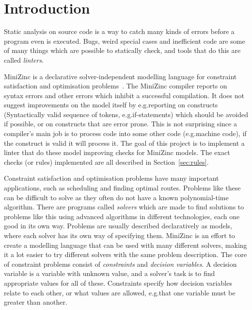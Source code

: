\documentclass[a4paper,12pt]{article}
\newcommand{\leblanc}{\clearpage\thispagestyle{empty}\null\clearpage}
\begin{document}
\leblanc

\tableofcontents

\cleardoublepage

\mainmatter

\section{Introduction}\label{sec:introduktion}
Static analysis on source code is a way to catch many kinds of errors before
a program even is executed.
Bugs, weird special cases and inefficient code are some of many things which are possible
to statically check, and tools that do this are called \emph{linters}.

MiniZinc is a declarative solver-independent modelling language for constraint
satisfaction and optimisation problems~\cite{MiniZinc}. The MiniZinc compiler reports on
syntax errors and other errors which inhibit a successful compilation. It does not suggest
improvements on the model itself by e.g.\@ reporting on constructs (Syntactically valid
sequence of tokens, e.g.\@ if-statements) which should be avoided if possible, or on
constructs that are error prone. This is not surprising since a compiler's main job is to
process code into some other code (e.g.\@ machine code), if the construct is valid it will
process it. The goal of this project is to implement a linter that do these model
improving checks for MiniZinc models. The exact checks (or rules) implemented are all
described in Section~\ref{sec:rules}.

Constraint satisfaction and optimisation problems have many important applications, such
as scheduling and finding optimal routes. Problems like these can be difficult to solve as
they often do not have a known polynomial-time algorithm. There are programs called
\emph{solvers} which are made to find solutions to problems like this using advanced
algorithms in different technologies, each one good in its own way. Problems are usually
described declaratively as models, where each solver has its own way of specifying them.
MiniZinc is an effort to create a modelling language that can be used with many different
solvers, making it a lot easier to try different solvers with the same problem
description. The core of constraint problems consist of \emph{constraints} and
\emph{decision variables}. A decision variable is a variable with unknown value, and a
solver's task is to find appropriate values for all of these. Constraints specify how
decision variables relate to each other, or what values are allowed, e.g.\@ that one
variable must be greater than another.
\end{document}
